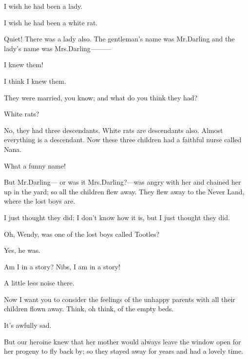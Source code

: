 \begin{drama}
\curlyspeaks
I wish he had been a lady.

\nibsspeaks
I wish he had been a white rat.

\wendyspeaks
Quiet!
There was a lady also.
The gentleman’s name was Mr.\@ Darling and the lady’s name was Mrs.\@ Darling———

\johnspeaks
I knew them!

I think I knew them.

\wendyspeaks
They were married, you know; and what do you think they had?

\nibsspeaks
White rats?

\wendyspeaks
No, they had three descendants.
White rats are descendants also.
Almost everything is a descendant.
Now these three children had a faithful nurse called Nana.

What a funny name!

\wendyspeaks
But Mr.\@ Darling— or was it Mrs.\@ Darling?—was angry with her
and chained her up in the yard;
so all the children flew away.
They flew away to the Never Land, where the lost boys are.

\curlyspeaks
I just thought they did;
I don’t know how it is, but I just thought they did.

\tootlesspeaks
Oh, Wendy, was one of the lost boys called Tootles?

\wendyspeaks
Yes, he was.

Am I in a story?
Nibs, I am in a story!

A little less noise there.

Now I want you to consider the feelings of the unhappy parents with all their children flown away.
Think, oh think, of the empty beds.

It’s awfully sad.

\wendyspeaks
But our heroine knew that her mother would always leave the window open for her progeny to fly back by;
so they stayed away for years and had a lovely time.



\end{drama}
